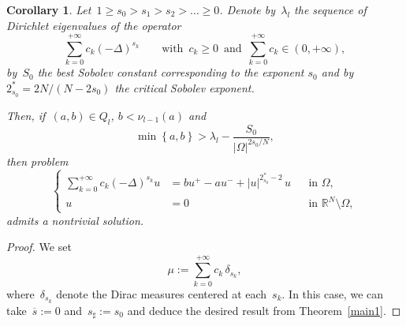 \documentclass[12pt,a4paper,intlimits,sumlimits]{amsart}
\def \R {\mathbb{R}}
\newcommand{\set}[1]{\left\{#1\right\}}
\theoremstyle{definition}
\theoremstyle{plain}
\newtheorem{corollary}[definition]{Corollary}
\numberwithin{equation}{section}
\renewcommand{\ge}{\geqslant}
\begin{document}
\begin{corollary}\label{serie1}
Let~$1\ge s_0 > s_1> s_2 >\dots \ge 0$. 
Denote by~$\lambda_l$ the sequence of Dirichlet eigenvalues of the operator
\[
\sum_{k=0}^{+\infty} c_k (-\Delta)^{s_k} 
\qquad{\mbox{with $\,c_k\ge 0\,$ and }} \,\sum_{k=0}^{+\infty} c_k \in (0, +\infty), 
\]
by~$S_0$ the best Sobolev constant corresponding to the exponent $s_0$ and
by~$2_{s_0}^* = 2N/(N-2s_0)$ the critical Sobolev exponent. 

Then, if~$(a, b)\in Q_l$, $b <\nu_{l-1}(a)$ and
\begin{equation*}
\min \set{a,b} > \lambda_l -\frac{S_0}{|\Omega|^{2s_0/N}},
\end{equation*}
then problem \begin{equation*}
\left\{\begin{aligned}
\sum_{k=0}^{+\infty} c_k (-\Delta)^{s_k} u & = bu^+ - au^- + |u|^{2_{s_0}^* - 2}\, u && \text{in } \Omega,\\
u & = 0 && \text{in } \R^N \setminus \Omega,
\end{aligned}\right.
\end{equation*}
admits a nontrivial solution.\end{corollary}

\begin{proof}
We set
\[
\mu:=\sum_{k=0}^{+\infty} c_k \,\delta_{s_k} , 
\]
where~$\delta_{s_k}$ denote the Dirac measures centered at each~$s_k$. In this case,
we can take~$\overline s:=0$ and~$s_\sharp:=s_0$ and deduce the desired result from
Theorem~\ref{main1}.
\end{proof}
\end{document}
